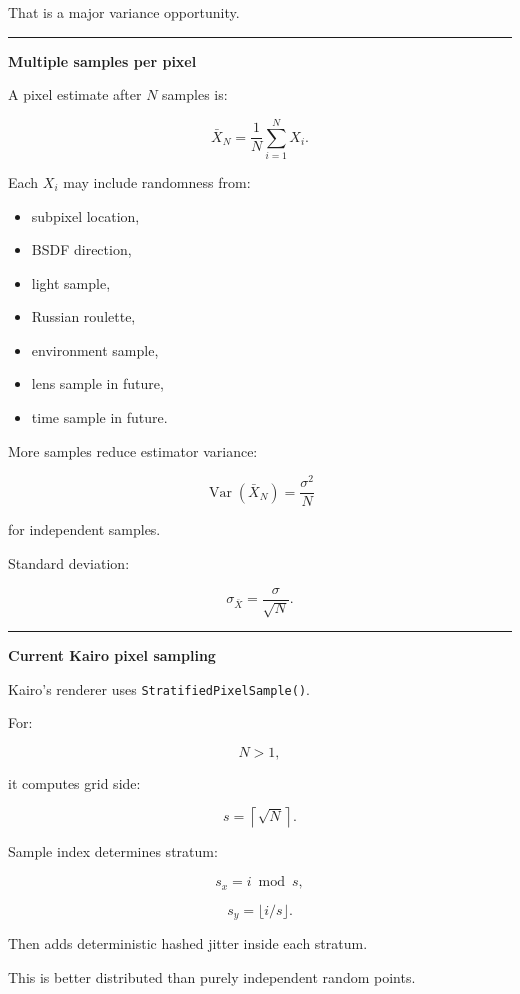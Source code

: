 That is a major variance opportunity.

\begin{center}\rule{0.5\linewidth}{0.5pt}\end{center}

\textbf{Multiple samples per pixel}

A pixel estimate after \(N\) samples is:

\[
\boxed{
\bar X_N
=
\frac1N
\sum_{i=1}^NX_i.
}
\]

Each \(X_i\) may include randomness from:

\begin{itemize}
\tightlist
\item
  subpixel location,
\item
  BSDF direction,
\item
  light sample,
\item
  Russian roulette,
\item
  environment sample,
\item
  lens sample in future,
\item
  time sample in future.
\end{itemize}

More samples reduce estimator variance:

\[
\operatorname{Var}(\bar X_N)
=
\frac{\sigma^2}{N}
\]

for independent samples.

Standard deviation:

\[
\boxed{
\sigma_{\bar X}
=
\frac{\sigma}{\sqrt N}.
}
\]

\begin{center}\rule{0.5\linewidth}{0.5pt}\end{center}

\textbf{Current Kairo pixel sampling}

Kairo's renderer uses \texttt{StratifiedPixelSample()}.

For:

\[
N>1,
\]

it computes grid side:

\[
s=
\left\lceil
\sqrt N
\right\rceil.
\]

Sample index determines stratum:

\[
s_x=i\bmod s,
\]

\[
s_y=\lfloor i/s\rfloor.
\]

Then adds deterministic hashed jitter inside each stratum.

This is better distributed than purely independent random points.

